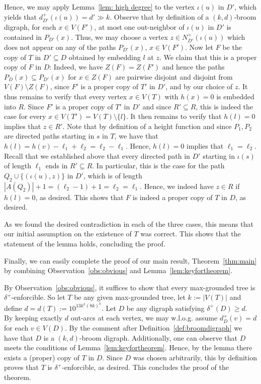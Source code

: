 \documentclass[a4paper,11pt]{article}
\makeatletter
\renewenvironment{proof}[1][\proofname] {\par\pushQED{\qed}\normalfont\topsep6\p@\@plus6\p@\relax\trivlist\item[\hskip\labelsep\bfseries#1\@addpunct{.}]\ignorespaces}{\popQED\endtrivlist\@endpefalse}
\theoremstyle{definition}
\makeatother
\begin{document}
\begin{proof}
    Hence, we may apply Lemma~\ref{lem: high degree} to the vertex $\iota(u)$ in $D'$, which yields that $d_{D'}^+(\iota(u))=d'\gg k$. Observe that by definition of a $(k,d)$-broom digraph, for each $x\in V(F')$, at most one out-neighbor of $\iota(u)$ in $D'$ is contained in $P_{D'}(x)$. Thus, we may choose a vertex $z\in N^+_{D'}(\iota(u))$ which does not appear on any of the paths $P_{D'}(x)$, $x\in V(F')$. Now let $F$ be the copy of $T$ in $D'\subseteq D$ obtained by embedding $l$ at $z$. We claim that this is a proper copy of $F$ in $D$: Indeed, we have $Z(F)=Z(F')$ and hence the paths $P_D(x)\subseteq P_{D'}(x)$ for $x\in Z(F)$ are pairwise disjoint and disjoint from $V(F)\setminus Z(F)$, since $F'$ is a proper copy of $T'$ in $D'$, and by our choice of $z$. It thus remains to verify that every vertex $x\in V(T)$ with $h(x)=0$ is embedded into $R$. Since $F'$ is a proper copy of $T'$ in $D'$ and since $R'\subseteq R$, this is indeed the case for every $x\in V(T')=V(T)\setminus \{l\}$. It then remains to verify that $h(l)=0$ implies that $z\in R'$. Note that by definition of a height function and since $P_1, P_2$ are directed paths starting in $s$ in $T$, we have that $h(l)=h(v)-\ell_1+\ell_2=\ell_2-\ell_1$. Hence, $h(l)=0$ implies that $\ell_1=\ell_2$. Recall that we established above that every directed path in $D'$ starting in $\iota(s)$ of length $\ell_1$ ends in $R'\subseteq R$. In particular, this is the case for the path $Q_2\cup\{(\iota(u),z)\}$ in $D'$, which is of length $|A(Q_2)|+1=(\ell_2-1)+1=\ell_2=\ell_1$. Hence, we indeed have $z\in R$ if $h(l)=0$, as desired. This shows that $F$ is indeed a proper copy of $T$ in $D$, as desired.

As we found the desired contradiction in each of the three cases, this means that our initial assumption on the existence of $T$ was correct. This shows that the statement of the lemma holds, concluding the proof.
\end{proof}

Finally, we can easily complete the proof of our main result, Theorem~\ref{thm:main} by combining Observation~\ref{obs:obvious} and Lemma~\ref{lem:keyfortheorem}.
\begin{proof}[Proof of Theorem~\ref{thm:main}]
By Observation~\ref{obs:obvious}, it suffices to show that every max-grounded tree is $\delta^+$-enforcible. So let $T$ be any given max-grounded tree, let $k:=|V(T)|$ and define $d=d(T):=10^{13k^3(8k)^k}$. Let $D$ be any digraph satisfying $\delta^+(D)\ge d$. By keeping exactly $d$ out-arcs at each vertex, we may w.l.o.g. assume $d_D^+(v)=d$ for each $v\in V(D)$. By the comment after Definition~\ref{def:broomdigraph} we have that $D$ is a $(k,d)$-broom digraph. Additionally, one can observe that $D$ meets the conditions of Lemma~\ref{lem:keyfortheorem}. Hence, by the lemma there exists a (proper) copy of $T$ in $D$. Since $D$ was chosen arbitrarily, this by definition proves that $T$ is $\delta^+$-enforcible, as desired. This concludes the proof of the theorem.
\end{proof}
\end{document}
